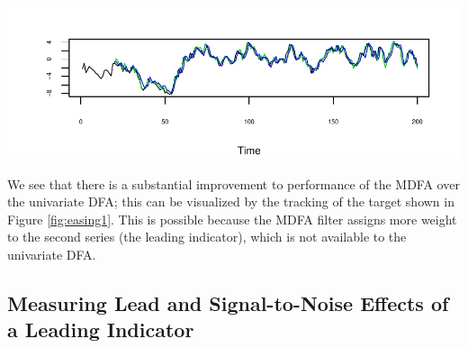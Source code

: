 \documentclass[a4paper]{book}
\begin{document}
\begin{Schunk}
\begin{Soutput}
\begin{figure}[htb!]
\end{Soutput}
\begin{Soutput}
\begin{center}
\end{Soutput}
\begin{Soutput}
\includegraphics[]{mdfa_bimdfa-udfa.pdf}
\end{Soutput}
\begin{Soutput}
\caption{One-step ahead forecasts
 based upon MDFA (green) and univariate DFA (blue), with target in black.
\end{Soutput}
\begin{Soutput}
\label{fig:easing1}}
\end{Soutput}
\begin{Soutput}
\end{center}
\end{Soutput}
\begin{Soutput}
\end{figure}
\end{Soutput}
\end{Schunk}

We see that there is a substantial improvement to performance of the MDFA over
 the univariate DFA; this can be visualized by the tracking of the target
 shown in Figure \ref{fig:easing1}.  This is possible because the MDFA filter
 assigns more weight to the second series (the leading indicator), which is
 not available to the univariate DFA.
 

\subsection{Measuring Lead and Signal-to-Noise Effects of a Leading Indicator}
 \label{sec:lead.snr}
\end{document}
